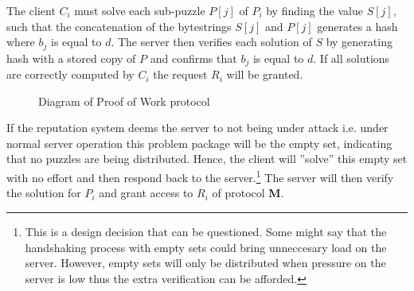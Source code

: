 The client $C_i$ must solve each sub-puzzle $P[j]$ of $P_i$ by finding the value $S[j]$, such that the concatenation of the bytestrings $S[j]$ and $P[j]$ generates a hash where $b_j$ is equal to $d$. The server then verifies each solution of $S$ by generating hash with a stored copy of $P$ and confirms that $b_j$ is equal to $d$. If all solutions are correctly computed by $C_i$ the request $R_i$ will be granted. 

\begin{figure}
	\begin{center}
		 \vspace{10pt}
		\caption{Diagram of Proof of Work protocol}\label{tab:protocol}
	 \end{center}
\end{figure}

If the reputation system deems the server to not being under attack i.e. under normal server operation this problem package will be the empty set, indicating that no puzzles are being distributed.
Hence, the client will ''solve'' this empty set with no effort and then respond back to the server.\footnote{This is a design decision that can be questioned.
Some might say that the handshaking process with empty sets could bring unneccesary load on the server.
However, empty sets will only be distributed when pressure on the server is low thus the extra verification can be afforded.}
The server will then verify the solution for $P_i$ and grant access to $R_i$ of protocol \textbf{M}.

